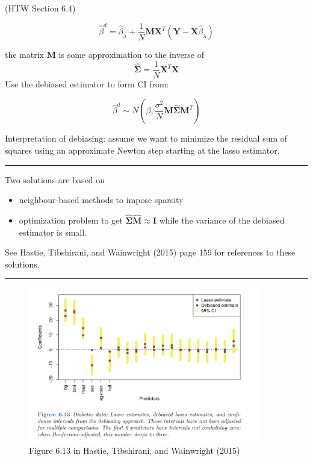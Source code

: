 \documentclass[
  letterpaper,
  DIV=11,
  numbers=noendperiod]{scrartcl}
\providecommand{\tightlist}{%
  \setlength{\itemsep}{0pt}\setlength{\parskip}{0pt}}\usepackage{longtable,booktabs,array}
\begin{document}
(HTW Section 6.4)

\[\hat{\beta}^d=\hat{\beta}_{\lambda}+\frac{1}{N}{\boldsymbol M}{\boldsymbol X}^T(\boldsymbol Y-\boldsymbol X \hat{\beta}_{\lambda})\]

the matrix \({\boldsymbol M}\) is some approximation to the inverse of
\[\hat{\boldsymbol \Sigma}=\frac{1}{N}{\boldsymbol X}^T{\boldsymbol X}\]
Use the debiased estimator to form CI from:

\[\hat{\beta}^d \sim N(\beta,\frac{\sigma^2}{N}{\boldsymbol M}\hat{\boldsymbol \Sigma}{\boldsymbol M}^T)\]

Interpretation of debiasing: assume we want to minimize the residual sum
of squares using an approximate Newton step starting at the lasso
estimator.

\begin{center}\rule{0.5\linewidth}{0.5pt}\end{center}

Two solutions are based on

\begin{itemize}
\tightlist
\item
  neighbour-based methods to impose sparsity
\item
  optimization problem to get
  \(\hat{\boldsymbol \Sigma}\hat{\boldsymbol M}\approx \boldsymbol I\)
  while the variance of the debiased estimator is small.
\end{itemize}

See Hastie, Tibshirani, and Wainwright (2015) page 159 for references to
these solutions.

\begin{center}\rule{0.5\linewidth}{0.5pt}\end{center}

\begin{figure}

{\centering \includegraphics[width=0.9\textwidth,height=\textheight]{./HTWFig613.jpg}

}

\caption{Figure 6.13 in Hastie, Tibshirani, and Wainwright (2015)}

\end{figure}
\end{document}
